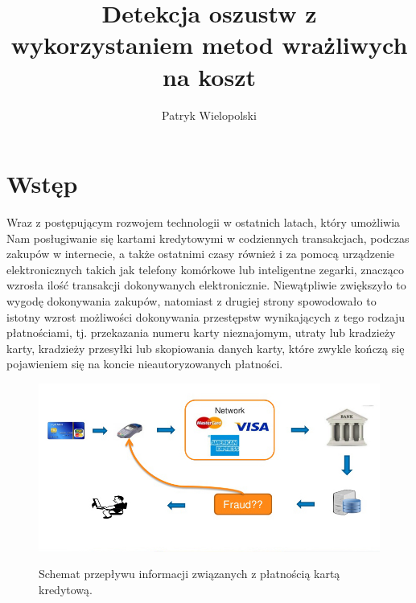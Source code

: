 \documentclass{book}
\title{Detekcja oszustw z wykorzystaniem metod wrażliwych na koszt}
\author{Patryk Wielopolski}
\begin{document}
	
	\newcommand{\htx}{h_{\theta}(\boldsymbol{x_i})}
	\newcommand{\es}{\mathcal{S}}
	\newcommand{\ef}{\mathcal{F}}
	\newcommand{\iks}{\boldsymbol{x}}
	\newcommand{\bes}{\boldsymbol{S}}
	\newcommand{\yht}[1]{y_i^{(#1)}}
	\newcommand{\ylab}[2]{\text{#1}_{\text{#2}}}
	
	\newenvironment{talign}
	{\align}
	{\endalign}
	
	\newenvironment{talign*}
	{\csname align*\endcsname}
	{\endalign}

\maketitle

\chapter{Wstęp}
	Wraz z postępującym rozwojem technologii w ostatnich latach, który umożliwia Nam posługiwanie się kartami kredytowymi w codziennych transakcjach, podczas zakupów w internecie, a także ostatnimi czasy również i za pomocą urządzenie elektronicznych takich jak telefony komórkowe lub inteligentne zegarki, znacząco wzrosła ilość transakcji dokonywanych elektronicznie. Niewątpliwie zwiększyło to wygodę dokonywania zakupów, natomiast z drugiej strony spowodowało to istotny wzrost możliwości dokonywania przestępstw wynikających z tego rodzaju płatnościami, tj. przekazania numeru karty nieznajomym, utraty lub kradzieży karty, kradzieży przesyłki lub skopiowania danych karty, które zwykle kończą się pojawieniem się na koncie nieautoryzowanych płatności.

	\begin{figure}[h]
		\includegraphics[width=\linewidth]{images/credit-card-flow.jpg}
		\label{credit-card-flow}
		\caption{Schemat przepływu informacji związanych z płatnością kartą kredytową.}
	\end{figure}
\end{document}
